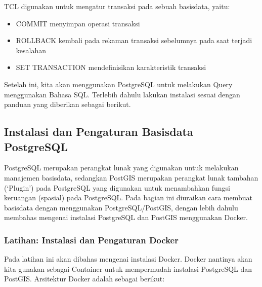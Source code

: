 \documentclass[letterpaper,10pt,english]{sphinxmanual}
\begin{document}
\begin{itemize}
TCL digunakan untuk mengatur transaksi pada sebuah basisdata, yaitu:
\begin{itemize}
\item {} 
COMMIT \sphinxhyphen{} menyimpan operasi transaksi

\item {} 
ROLLBACK \sphinxhyphen{} kembali pada rekaman transaksi sebelumnya pada saat terjadi kesalahan

\item {} 
SET TRANSACTION \sphinxhyphen{} mendefinisikan karakteristik transaksi

\end{itemize}

\end{itemize}

Setelah ini, kita akan menggunakan PostgreSQL untuk melakukan Query menggunakan Bahasa SQL. Terlebih dahulu lakukan instalasi sesuai dengan panduan yang diberikan sebagai berikut.


\subsection{Instalasi dan Pengaturan Basisdata PostgreSQL}
\label{\detokenize{sesi2/relationaldb:instalasi-dan-pengaturan-basisdata-postgresql}}
PostgreSQL merupakan perangkat lunak yang digunakan untuk melakukan manajemen basisdata, sedangkan PostGIS merupakan perangkat lunak tambahan (‘Plugin’) pada PostgreSQL yang digunakan untuk menambahkan fungsi keruangan (spasial) pada PostgreSQL. Pada bagian ini diuraikan cara membuat basisdata dengan menggunakan PostgreSQL/PostGIS, dengan lebih dahulu membahas mengenai instalasi PostgreSQL dan PostGIS menggunakan Docker.


\subsubsection{Latihan: Instalasi dan Pengaturan Docker}
\label{\detokenize{sesi2/relationaldb:latihan-instalasi-dan-pengaturan-docker}}
Pada latihan ini akan dibahas mengenai instalasi Docker. Docker nantinya akan kita gunakan sebagai Container untuk mempermudah instalasi PostgreSQL dan PostGIS. Arsitektur Docker adalah sebagai berikut:

\end{document}
